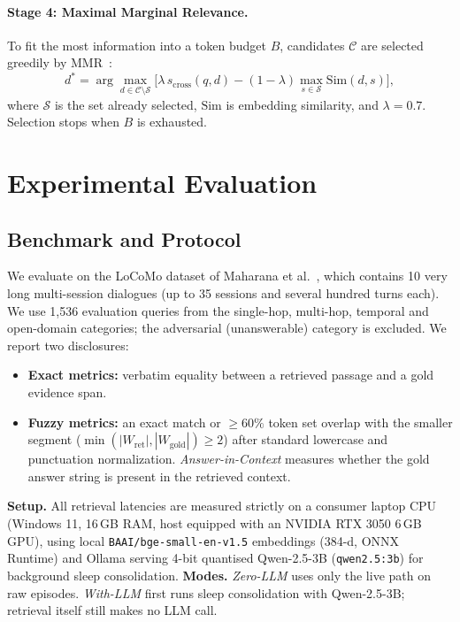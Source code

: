 \documentclass[11pt]{article}
\begin{document}
\paragraph{Stage 4: Maximal Marginal Relevance.}
To fit the most information into a token budget $B$, candidates $\mathcal{C}$ are selected greedily by MMR~\cite{carbonell1998mmr}:
\begin{equation}
  d^{*}=\arg\max_{d\in\mathcal{C}\setminus\mathcal{S}}\Big[\lambda\,s_{\text{cross}}(q,d)-(1-\lambda)\max_{s\in\mathcal{S}}\mathrm{Sim}(d,s)\Big],
  \label{eq:mmr}
\end{equation}
where $\mathcal{S}$ is the set already selected, $\mathrm{Sim}$ is embedding similarity, and $\lambda=0.7$. Selection stops when $B$ is exhausted.

\section{Experimental Evaluation}
\label{sec:eval}

\subsection{Benchmark and Protocol}
We evaluate on the LoCoMo dataset of Maharana et al.~\cite{maharana2024locomo}, which contains 10 very long multi-session dialogues (up to 35 sessions and several hundred turns each). We use 1,536 evaluation queries from the single-hop, multi-hop, temporal and open-domain categories; the adversarial (unanswerable) category is excluded.
We report two disclosures:
\begin{itemize}
    \item \textbf{Exact metrics:} verbatim equality between a retrieved passage and a gold evidence span.
    \item \textbf{Fuzzy metrics:} an exact match or $\ge 60\%$ token set overlap with the smaller segment ($\min(|W_{\text{ret}}|, |W_{\text{gold}}|) \ge 2$) after standard lowercase and punctuation normalization.
    \emph{Answer-in-Context} measures whether the gold answer string is present in the retrieved context.
\end{itemize}
\textbf{Setup.} All retrieval latencies are measured strictly on a consumer laptop CPU (Windows 11, 16\,GB RAM, host equipped with an NVIDIA RTX 3050 6\,GB GPU), using local \texttt{BAAI/bge-small-en-v1.5} embeddings (384-d, ONNX Runtime) and Ollama serving 4-bit quantised Qwen-2.5-3B (\texttt{qwen2.5:3b}) for background sleep consolidation. \textbf{Modes.} \emph{Zero-LLM} uses only the live path on raw episodes. \emph{With-LLM} first runs sleep consolidation with Qwen-2.5-3B; retrieval itself still makes no LLM call.
\end{document}
